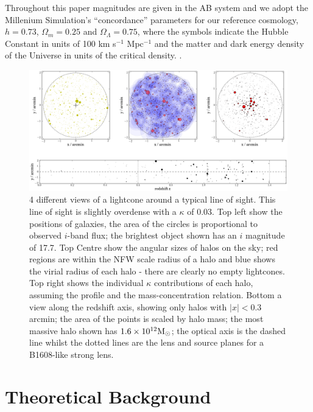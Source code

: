 \documentclass[useAMS,usenatbib]{mn2e}
\begin{document}
Throughout this paper magnitudes are given in the AB system and
we adopt the Millenium Simulation's ``concordance'' parameters for our reference cosmology, \ie
$h=0.73$, $\Omega_m=0.25$ and $\Omega_\Lambda=0.75$, where the symbols indicate
the Hubble Constant in units of 100 km s$^{-1}$ Mpc$^{-1}$ and the matter and
dark energy density of the Universe in units of the critical density.
.%



\begin{figure}
\includegraphics[width=\textwidth]{figs/viewofalightcone.eps}
\caption[magcut]{4 different views of a lightcone around a typical line
of sight. This line of sight is slightly overdense with a $\kappa$ of
0.03. Top left show the positions of galaxies, the area of the circles
is proportional to observed $i$-band flux; the brightest object shown
has an $i$ magnitude of 17.7. Top Centre show the angular sizes of halos
on the sky; red regions are within the NFW scale radius of a halo and
blue shows the virial radius of each halo - there are clearly no empty
lightcones. Top right shows the individual $\kappa$ contributions of
each halo, assuming the \citet{BMO} profile and the \citet{Neto2007}
mass-concentration relation. Bottom a view along the redshift axis,
showing only halos with $|x|<0.3$ arcmin; the area of the points is
scaled by halo mass; the most massive halo shown has
$1.6\times10^{12}\Msun$; the optical axis is the dashed line whilst the
dotted lines are the lens and source planes for a B1608-like strong
lens.}
\label{fig:lightcone}
\end{figure}




\section{Theoretical Background}
\label{sec:theory}
\end{document}
